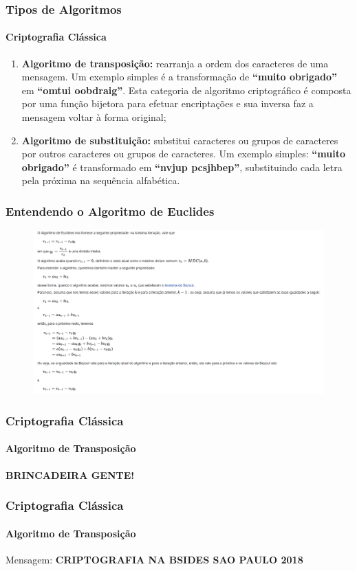 \documentclass[compress]{beamer}
\begin{document}
\begin{frame}
\frametitle{Tipos de Algoritmos}
\framesubtitle{Criptografia Clássica}
\begin{enumerate}
	\justifying
	\item<+->{\textbf{Algoritmo de transposição:} rearranja a ordem dos caracteres de uma mensagem. Um exemplo simples é a transformação de \textbf{“muito obrigado”} em \textbf{“omtui oobdraig”}. Esta categoria de algoritmo criptográfico é composta por uma função bijetora	para efetuar encriptações e sua	inversa faz a mensagem voltar à forma original;}
	\item<+->{\textbf{Algoritmo de substituição:} substitui caracteres ou grupos de caracteres por outros caracteres ou grupos de caracteres. Um exemplo simples: \textbf{“muito obrigado”} é transformado em \textbf{“nvjup pcsjhbep”}, substituindo cada letra pela próxima na sequência alfabética.}
\end{enumerate}
\end{frame}

\begin{frame}
\frametitle{Entendendo o Algoritmo de Euclides}
\begin{figure}[h]
	\includegraphics[width=\textwidth]{pics/euclides_1}
\end{figure}
\end{frame}

\begin{frame}
\frametitle{Criptografia Clássica}
\framesubtitle{Algoritmo de Transposição}
\centering
\textbf{{\LARGE BRINCADEIRA GENTE!}}
\end{frame}

\begin{frame}
\frametitle{Criptografia Clássica}
\framesubtitle{Algoritmo de Transposição}
\centering
Mensagem: \textbf{CRIPTOGRAFIA NA BSIDES SAO PAULO 2018}
\end{frame}
\end{document}
